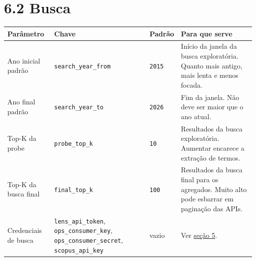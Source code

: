 \documentclass[
  brazilian,
  a4paper,12pt,oneside]{report}
\newcounter{none} %
\begin{document}
\section{6.2 Busca}\label{busca}

{\def\LTcaptype{none} %
\begin{longtable}[]{@{}
  >{\raggedright\arraybackslash}p{}
  >{\raggedright\arraybackslash}p{}
  >{\raggedright\arraybackslash}p{}
  >{\raggedright\arraybackslash}p{}@{}}
\toprule\noalign{}
\begin{minipage}[b]{\linewidth}\raggedright
Parâmetro
\end{minipage} & \begin{minipage}[b]{\linewidth}\raggedright
Chave
\end{minipage} & \begin{minipage}[b]{\linewidth}\raggedright
Padrão
\end{minipage} & \begin{minipage}[b]{\linewidth}\raggedright
Para que serve
\end{minipage} \\
\midrule\noalign{}
\endhead
\bottomrule\noalign{}
\endlastfoot
Ano inicial padrão &
\texttt{search\_}\allowbreak{}\texttt{year\_}\allowbreak{}\texttt{from}
& \texttt{2015} & Início da janela da busca exploratória. Quanto mais
antigo, mais lenta e menos focada. \\
Ano final padrão &
\texttt{search\_}\allowbreak{}\texttt{year\_}\allowbreak{}\texttt{to} &
\texttt{2026} & Fim da janela. Não deve ser maior que o ano atual. \\
Top-K da probe &
\texttt{probe\_}\allowbreak{}\texttt{top\_}\allowbreak{}\texttt{k} &
\texttt{10} & Resultados da busca exploratória. Aumentar encarece a
extração de termos. \\
Top-K da busca final &
\texttt{final\_}\allowbreak{}\texttt{top\_}\allowbreak{}\texttt{k} &
\texttt{100} & Resultados da busca final para os agregados. Muito alto
pode esbarrar em paginação das APIs. \\
Credenciais de busca &
\texttt{lens\_}\allowbreak{}\texttt{api\_}\allowbreak{}\texttt{token},
\texttt{ops\_}\allowbreak{}\texttt{consumer\_}\allowbreak{}\texttt{key},
\texttt{ops\_}\allowbreak{}\texttt{consumer\_}\allowbreak{}\texttt{secret},
\texttt{scopus\_}\allowbreak{}\texttt{api\_}\allowbreak{}\texttt{key} &
vazio & Ver \hyperref[5-apis-de-busca]{seção 5}. \\
\end{longtable}
}
\end{document}

